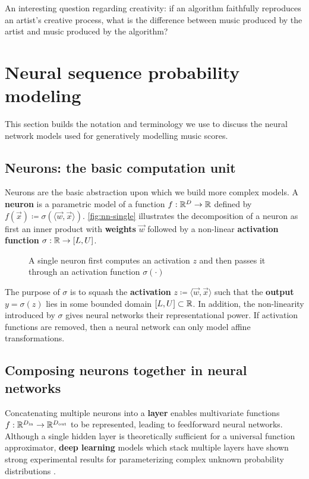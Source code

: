 An interesting question regarding creativity: if an algorithm faithfully reproduces
an artist's creative process, what is the difference between music produced by the artist
and music produced by the algorithm?

\section{Neural sequence probability modeling}

This section builds the notation and terminology we use to discuss the neural network
models used for generatively modelling music scores.

\subsection{Neurons: the basic computation unit}

Neurons are the basic abstraction upon which we build more complex
models. A \textbf{neuron} is a parametric model of a function $f : \mathbb{R}^D \to
\mathbb{R}$ defined by $f(\vec{x}) \coloneqq \sigma( \langle \vec{w}, \vec{x} \rangle
)$. \autoref{fig:nn-single} illustrates the decomposition of a neuron as first
an inner product with \textbf{weights} $\vec{w}$ followed by a non-linear
\textbf{activation function} $\sigma : \mathbb{R} \to [L, U]$.

\begin{figure}[htpb]
    \centering
    
    \caption{A single neuron first computes an activation $z$ and then passes it through
    an activation function $\sigma(\cdot)$}
    \label{fig:nn-single}
\end{figure}

The purpose of $\sigma$ is to squash the \textbf{activation} $z \coloneqq
\langle \vec{w}, \vec{x} \rangle$ such that the \textbf{output} $y = \sigma(z)$
lies in some bounded domain $[L, U] \subset \mathbb{R}$. In addition, the
non-linearity introduced by $\sigma$ gives neural networks their
representational power. If activation functions are removed, then a neural
network can only model affine transformations.

\subsection{Composing neurons together in neural networks}

Concatenating multiple neurons into a \textbf{layer} enables multivariate functions $f :
\mathbb{R}^{D_\text{in}} \to \mathbb{R}^{D_\text{out}}$ to be represented, leading to feedforward
neural networks. Although a single hidden layer is theoretically sufficient for
a universal function approximator\cite{Cybenko1993}, \textbf{deep learning}
models which stack multiple layers have shown strong experimental results
for parameterizing complex unknown probability distributions \cite{Bengio2011}.

